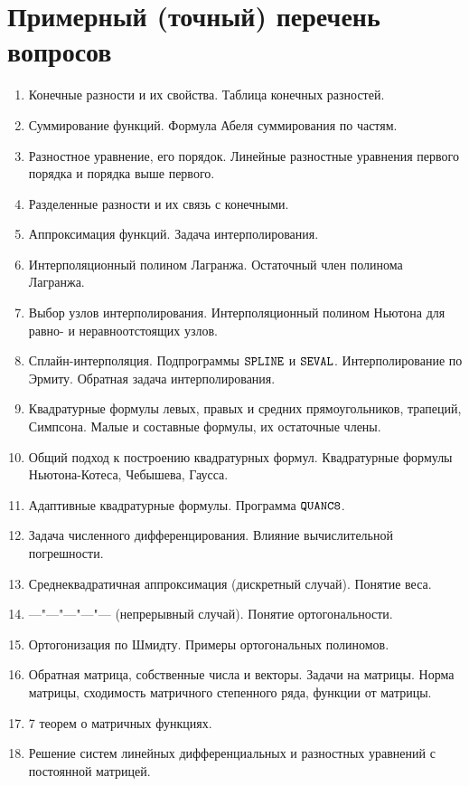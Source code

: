 \documentclass[a4paper,11pt]{article}
\begin{document}
\section{Примерный (точный) перечень вопросов}

\begin{enumerate}
    \item Конечные разности и их свойства. Таблица конечных разностей.
    \item Суммирование функций. Формула Абеля суммирования по частям.
    \item Разностное уравнение, его порядок. 
                Линейные разностные уравнения первого порядка и порядка выше первого.
    \item Разделенные разности и их связь с конечными.
    \item Аппроксимация функций. Задача интерполирования.
    \item Интерполяционный полином Лагранжа. Остаточный член полинома Лагранжа.
    \item Выбор узлов интерполирования. Интерполяционный полином Ньютона для равно- и неравноотстоящих узлов.
    \item Сплайн-интерполяция. Подпрограммы $\verb|SPLINE|$ и $\verb|SEVAL|$.
                Интерполирование по Эрмиту. Обратная задача интерполирования.
    \item Квадратурные формулы левых, правых и средних прямоугольников, трапеций, Симпсона.
                Малые и составные формулы, их остаточные члены.
    \item Общий подход к построению квадратурных формул. Квадратурные формулы Ньютона-Котеса, Чебышева, Гаусса.
    \item Адаптивные квадратурные формулы. Программа $\verb|QUANC8|$.
    \item Задача численного дифференцирования. Влияние вычислительной погрешности.
    \item Среднеквадратичная аппроксимация (дискретный случай). Понятие веса.
    \item ---"---"---"---"--- (непрерывный случай). Понятие ортогональности.
    \item Ортогонизация по Шмидту. Примеры ортогональных полиномов.
    \item Обратная матрица, собственные числа и векторы. Задачи на матрицы.
                Норма матрицы, сходимость матричного степенного ряда, функции от матрицы.
    \item 7 теорем о матричных функциях.
    \item Решение систем линейных дифференциальных и разностных уравнений с постоянной матрицей.

\end{enumerate}
\end{document}
